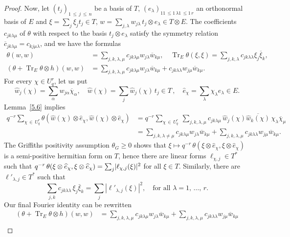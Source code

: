 \documentclass[AHL,Unicode,longabstracts,published]{cedram}
\DeclareMathOperator{\Tr}{Tr}
\DeclarePairedDelimiter{\abs}{\lvert}{\rvert}
\let\leq\leqslant
\let\geq\geqslant
\begin{document}
\begin{proof}
Now, let $(t_j)_{1\,\leq\,j\,\leq\,n}$ be a basis of $T$, $(e_\lambda)_{11\,\leq1\,\lambda1\,\leq1\,r}$ an orthonormal basis of $E$ and $\xi=\sum_j\xi_jt_j\in T$, $w=\sum_{j,\lambda}w_{j\lambda}\,t_j\otimes e_\lambda \in T\otimes E$. The coefficients $c_{jk\lambda\mu}$ of $\theta$ with respect to the basis $t_j\otimes e_\lambda$ satisfy the symmetry relation $\overline c_{jk\lambda\mu}=c_{kj\mu\lambda}$, and we have the formulas
\begin{align*}
\theta(w,w) &=\sum_{j,k,\lambda,\mu}c_{jk\lambda\mu}w_{j\lambda}\overline w_{k\mu},\quad
\Tr_E\theta(\xi,\xi)=\sum_{j,k,\lambda}c_{jk\lambda\lambda}\xi_j\overline\xi_k,\\
(\theta+\Tr_E\theta\otimes h)(w,w)&=\sum_{j,k,\lambda,\mu}c_{jk\lambda\mu} w_{j\lambda} \overline w_{k\mu}+ c_{jk\lambda\lambda}w_{j\mu}\overline w_{k\mu}.
\end{align*}
For every $\chi\in U^r_q$, let us put
\[
\widehat w_j(\chi)=\sum_\alpha w_{j\alpha}\overline\chi_\alpha,\quad
\widehat w(\chi)=\sum_j\widehat w_j(\chi)\,t_j\in T\,,\quad
\widehat e_\chi=\sum_\lambda\chi_\lambda e_\lambda\in E.
\]
Lemma~\ref{5.6} implies
\begin{align*}
q^{-r} \sum_{\chi\,\in\,U^r_q}\theta(\widehat w(\chi)\otimes\widehat e_\chi,
\widehat w(\chi)\otimes\widehat e_\chi) &=q^{-r}\sum_{\chi\,\in\,U^r_q}~\sum_{j,k,\lambda,\mu}c_{jk\lambda\mu}\,
\widehat w_j(\chi)\overline{\widehat w_k(\chi)}\,\chi_\lambda \overline \chi_\mu\\
&= \sum_{j,k,\lambda\ne \mu} c_{jk\lambda\mu} w_{j\lambda} \overline w_{k\mu} +
\sum_{j,k,\lambda,\mu} c_{jk\lambda\lambda} w_{j\mu} \overline w_{k\mu}.
\end{align*}
The Griffiths positivity assumption $\theta_G\geq 0$ shows that $\xi\mapsto q^{-r}\,\theta(\xi\otimes\widehat e_\chi,\xi\otimes\widehat e_\chi)$ is a semi-positive hermitian form on $T$, hence there are linear forms $\ell_{\chi,j}\in T^*$ such that $q^{-r}\,\theta(\xi\otimes\widehat e_\chi, \xi\otimes\widehat e_\chi)=\sum_j\abs{\ell_{\chi,j}(\xi)}^2$ for all $\xi\in T$. Similarly, there are $\ell'_{\lambda,j}\in T^*$ such that
\[
\sum_{j,k} c_{jk\lambda\lambda}\,\xi_j\bar\xi_k =\sum_j\left|\ell'_{\lambda,j}(\xi)\right|^2,\quad
\text{for all }\lambda=1,\,\dotsc,\,r.
\]
Our final Fourier identity can be rewritten
\begin{align*}
(\theta + \Tr_E \theta \otimes h)(w,w) &=
\sum_{j,k,\lambda,\mu}c_{jk\lambda\mu}w_{j\lambda} \overline w_{k\mu}+
\sum_{j,k,\lambda,\mu}c_{jk\lambda\lambda}w_{j\mu} \overline w_{k\mu}
\\

\end{align*}
\end{proof}
\end{document}
